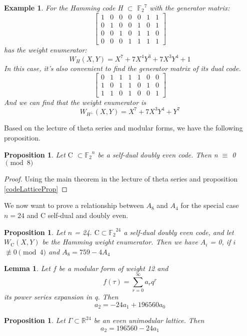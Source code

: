 \documentclass{article}
\newtheorem{lemma}[theorem]{Lemma}
\newtheorem{example}[theorem]{Example}
\newtheorem{prop}[theorem]{Proposition}
\numberwithin{equation}{theorem}
\numberwithin{figure}{theorem}
\newcommand{\Ftwo}{\ensuremath{\mathbb{F}_2}}
\newcommand{\simpleCodes}{\ensuremath{\mathrm{C}}}
\newcommand{\buildVertical}[1]{\ensuremath{#1^{\bot}}}
\newcommand{\weightEnumerator}[3]{\ensuremath{W_{#1}(#2,#3)}}
\newcommand{\Real}{\ensuremath{\mathbb{R}}}
\begin{document}
\begin{example}\label{hammingExample}
	For the Hamming code H $\subset$ $\Ftwo^7$ with the generator matrix:
	\[
	\left[
		\begin{matrix}
			1 &0 &0 &0 &0 &1 &1 \\
			0 &1 &0 &0 &1 &0 &1 \\
			0 &0 &1 &0 &1 &1 &0 \\
			0 &0 &0 &1 &1 &1 &1
		\end{matrix}
	\right]
	\]
	has the weight enumerator:
	\[
		\weightEnumerator{H}{X}{Y} = X^7 + 7X^4Y^3 + 7X^3Y^4 + 1
	\]
	In this case, it's also convenient to find the generator matrix of its dual code.
	\[
		\left[
			\begin{matrix}
				0 & 1 & 1 & 1 & 1 & 0 & 0 \\
				1 & 0 & 1 & 1 & 0 & 1 & 0 \\
				1 & 1 & 0 & 1 & 0 & 0 & 1
			\end{matrix}
		\right]
	\]
	And we can find that the weight enumerator is 
	\[
		\weightEnumerator{\buildVertical{H}}{X}{Y} = X^7 + 7X^3Y^4 + Y^7
 	\]
\end{example}
Based on the lecture of theta series and modular forms, we have the following proposition.
\begin{prop}
Let {\simpleCodes} $\subset \Ftwo^n$ be a self-dual doubly even code. Then n $\equiv$ 0 $\pmod 8$ 
\end{prop}
\begin{proof}
Using the main theorem in the lecture of theta series and proposition \ref{codeLatticeProp}
\end{proof}
We now want to prove a relationship between $A_8$ and $A_4$ for the special case $n = 24$ and $\simpleCodes$ self-dual and doubly even.
\begin{prop}\label{A8A4}
Let $n$ = 24. $\simpleCodes \subset \Ftwo^{24}$ a self-dual doubly even code, and let {\weightEnumerator{\simpleCodes}{X}{Y}} be the Hamming weight enumerator. Then we have $A_i$ = 0, if $i$ $\not\equiv 0 \pmod 4$ and $A_8 = 759 - 4 A_4$
\end{prop}
\begin{lemma}\label{a2a0a1}
Let $f$ be a modular form of weight 12 and
\[
	f(\tau) = \sum_{r = 0}^{\infty}a_rq^r
\]
its power series expansion in q. Then
\[
	a_2 = -24a_1 + 196560a_0
\]
\end{lemma}
\begin{prop}\label{a2a1}
Let $\Gamma \subset \Real^24$ be an even unimodular lattice. Then 
\[
	a_2 = 196560 - 24a_1
\] 
\end{prop}
\newpage
\end{document}
